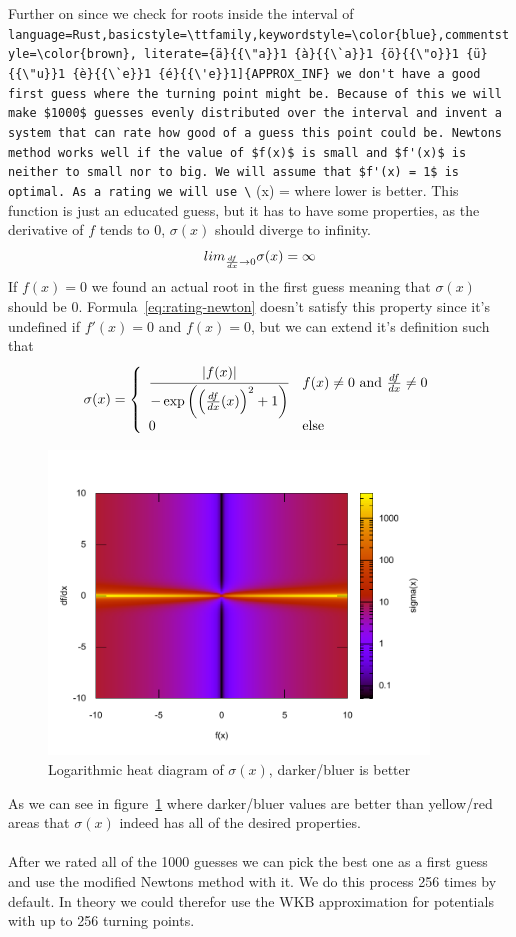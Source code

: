 \documentclass[11pt,DIV=10,final]{scrreprt} %
\providecommand{\rustinline}{\lstinline[language=Rust,basicstyle=\ttfamily,keywordstyle=\color{blue},commentstyle=\color{brown}, literate={ä}{{\"a}}1 {à}{{\`a}}1 {ö}{{\"o}}1 {ü}{{\"u}}1 {è}{{\`e}}1 {é}{{\'e}}1]} % für Inline-C++ Code
\newcommand{\deriv}[2]{%
  \frac{d#1}{d#2}
}
\begin{document}
Further on since we check for roots inside the interval of \rustinline{APPROX_INF} we don't
have a good first guess where the turning point might be. Because of this we will make $1000$
guesses evenly distributed over the interval and invent a system that can rate how good of a
guess this point could be.
Newtons method works well if the value of $f(x)$ is small and $f'(x)$ is neither to small nor to big. We will assume that $f'(x) = 1$ is optimal.
As a rating we will use
\[
  \label{eq:rating-newton}
  \sigma(x) = \cfrac{|f(x)| }{ -\exp\left({{\left(\deriv{f}{x}(x)\right)}^{2} + 1}\right)}
\]
where lower is better. This function is just an educated guess, but it has to have some properties, as the derivative of $f$ tends to 0, $\sigma(x)$ should diverge to infinity.
\[lim_{\deriv{f}{x} \to 0} \sigma(x) = \infty\]
If $f(x) = 0$ we found an actual root in the first guess meaning that $\sigma(x)$ should be 0.
Formula~\ref{eq:rating-newton} doesn't satisfy this property since it's undefined if $f'(x) = 0$ and $f(x) = 0$, but we can extend it's definition such that
\[
  \sigma(x) = \left\{
    \begin{array}{ll}
    \cfrac{|f(x)| }{ -\exp\left({{\left(\deriv{f}{x}(x)\right)}^{2} + 1}\right)} & f(x) \ne 0~\text{and}~\deriv{f}{x} \ne 0 \\
    0 & \text{else}
    \end{array}\right.
\]

\begin{figure}[H]\label{fig:simga-heat}
  \centering
  \includegraphics[width=0.9\textwidth]{plots/newton_rating_func.pdf}
  \caption{Logarithmic heat diagram of $\sigma(x)$, darker/bluer is better}
\end{figure}
As we can see in figure~\ref{fig:simga-heat} where darker/bluer values are better than yellow/red areas that $\sigma(x)$ indeed has all of the desired properties.
\\
\\
After we rated all of the 1000 guesses we can pick the best one as a first guess and use the modified Newtons method with it. We do this process 256 times by default. In theory we could therefor use the WKB approximation for potentials with up to 256 turning points.
\end{document}

